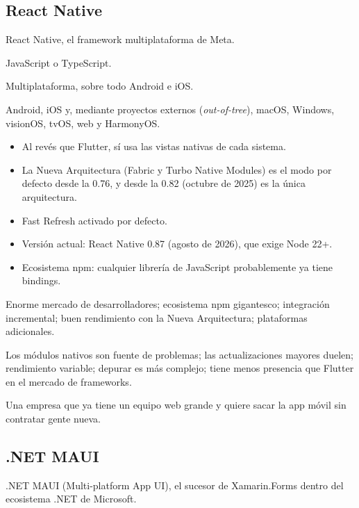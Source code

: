 \subsection{React Native}

 React Native, el framework multiplataforma de Meta.

 JavaScript o TypeScript.

 Multiplataforma, sobre todo Android e iOS.

 Android, iOS y, mediante proyectos externos (\emph{out-of-tree}), macOS, Windows, visionOS, tvOS, web y HarmonyOS.

\begin{itemize}[leftmargin=*,itemsep=0.2em,topsep=0.2em]
  \item Al revés que Flutter, sí usa las vistas nativas de cada sistema.
  \item La Nueva Arquitectura (Fabric y Turbo Native Modules) es el modo por defecto desde la 0.76, y desde la 0.82 (octubre de 2025) es la única arquitectura.
  \item Fast Refresh activado por defecto.
  \item Versión actual: React Native 0.87 (agosto de 2026), que exige Node 22+.
  \item Ecosistema npm: cualquier librería de JavaScript probablemente ya tiene bindings.
\end{itemize}

 Enorme mercado de desarrolladores; ecosistema npm gigantesco; integración incremental; buen rendimiento con la Nueva Arquitectura; plataformas adicionales.

 Los módulos nativos son fuente de problemas; las actualizaciones mayores duelen; rendimiento variable; depurar es más complejo; tiene menos presencia que Flutter en el mercado de frameworks.

 Una empresa que ya tiene un equipo web grande y quiere sacar la app móvil sin contratar gente nueva.

\subsection{.NET MAUI}

 .NET MAUI (Multi-platform App UI), el sucesor de Xamarin.Forms dentro del ecosistema .NET de Microsoft.

